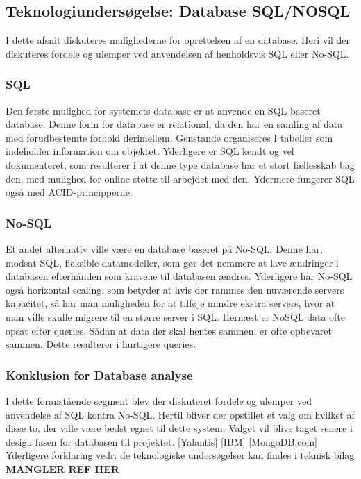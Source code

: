 \subsection{Teknologiundersøgelse: Database SQL/NOSQL
}
I dette afsnit diskuteres mulighederne for oprettelsen af en database. Heri vil der diskuteres fordele og ulemper ved anvendelsen af henholdsvis SQL eller No-SQL.

\subsubsection{SQL}
Den første mulighed for systemets database er at anvende en SQL baseret database. Denne form for database
er relational, da den har en samling af data med forudbestemte forhold derimellem. Genstande
organiseres I tabeller som indeholder information om objektet. Yderligere er SQL kendt og vel
dokumenteret, som resulterer i at denne type database har et stort fællesskab bag den, med mulighed for online støtte til arbejdet med den. Ydermere fungerer SQL også med ACID-principperne.

\subsubsection{No-SQL}
Et andet alternativ ville være en database baseret på No-SQL. Denne har, modsat SQL, fleksible
datamodeller, som gør det nemmere at lave ændringer i databasen efterhånden som kravene til
databasen ændres. Yderligere har No-SQL også horizontal scaling, som betyder at hvis der rammes
den nuværende servers kapacitet, så har man muligheden for at tilføje mindre ekstra servers, hvor at man ville skulle migrere til en større server i SQL. Hernæst er NoSQL data ofte opsat efter queries. Sådan at data der skal hentes sammen,
er ofte opbevaret sammen. Dette resulterer i hurtigere queries.

\subsubsection{Konklusion for Database analyse}
I dette foranstående segment blev der diskuteret fordele og ulemper ved anvendelse af SQL kontra
No-SQL. Hertil bliver der opstillet et valg om hvilket af disse to, der ville være bedst egnet til dette
system. Valget vil blive taget senere i design fasen for databasen til projektet.
[Yalantis] [IBM] [MongoDB.com] \\

\noindent Yderligere forklaring vedr. de teknologiske undersøgelser kan findes i teknisk bilag \textbf{MANGLER REF HER}
